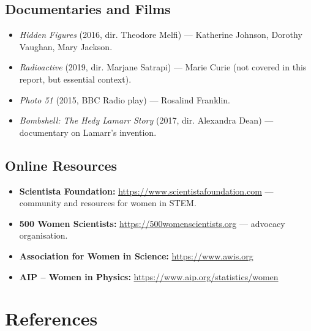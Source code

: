\documentclass[12pt,a4paper]{article}
\begin{document}
\subsection*{Documentaries and Films}

\begin{itemize}[itemsep=6pt]
\sloppy
\item \textit{Hidden Figures} (2016, dir. Theodore Melfi) — Katherine Johnson, Dorothy Vaughan, Mary Jackson.
\item \textit{Radioactive} (2019, dir. Marjane Satrapi) — Marie Curie (not covered in this report, but essential context).
\item \textit{Photo 51} (2015, BBC Radio play) — Rosalind Franklin.
\item \textit{Bombshell: The Hedy Lamarr Story} (2017, dir. Alexandra Dean) — documentary on Lamarr's invention.
\end{itemize}

\subsection*{Online Resources}

\begin{itemize}[itemsep=6pt]
\item \textbf{Scientista Foundation:} \url{https://www.scientistafoundation.com} — community and resources for women in STEM.
\item \textbf{500 Women Scientists:} \url{https://500womenscientists.org} — advocacy organisation.
\item \textbf{Association for Women in Science:} \url{https://www.awis.org}
\item \textbf{AIP -- Women in Physics:} \url{https://www.aip.org/statistics/women}
\end{itemize}

\newpage

\section*{References}
\end{document}
